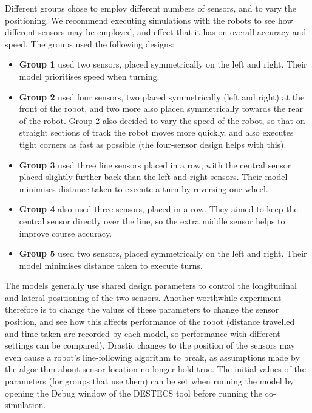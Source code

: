 Different groups chose to employ different numbers of sensors, and to
vary the positioning.  We recommend executing simulations with the
robots to see how different sensors may be employed, and effect that
it has on overall accuracy and speed.  The groups used the following
designs:
\begin{itemize}
\item \textbf{Group 1} used two sensors, placed symmetrically on the
  left and right.  Their model prioritises speed when turning.
\item \textbf{Group 2} used four sensors, two placed symmetrically
  (left and right) at the front of the robot, and two more also placed
  symmetrically towards the rear of the robot.  Group 2 also decided
  to vary the speed of the robot, so that on straight sections of
  track the robot moves more quickly, and also executes tight corners
  as fast as possible (the four-sensor design helps with this).
\item \textbf{Group 3} used three line sensors placed in a row, with
  the central sensor placed slightly further back than the left and
  right sensors.  Their model minimises distance taken to execute a
  turn by reversing one wheel.
\item \textbf{Group 4} also used three sensors, placed in a row.  They
  aimed to keep the central sensor directly over the line, so the
  extra middle sensor helps to improve course accuracy.
\item \textbf{Group 5} used two sensors, placed symmetrically on the
  left and right.  Their model minimises distance taken to execute
  turns.
\end{itemize}

The models generally use shared design parameters to control the
longitudinal and lateral positioning of the two sensors.  Another
worthwhile experiment therefore is to change the values of these
parameters to change the sensor position, and see how this affects
performance of the robot (distance travelled and time taken are
recorded by each model, so performance with different settings can be
compared).  Drastic changes to the position of the sensors may even
cause a robot's line-following algorithm to break, as assumptions made
by the algorithm about sensor location no longer hold true.  The
initial values of the parameters (for groups that use them) can be set
when running the model by opening the Debug window of the DESTECS tool
before running the co-simulation.


